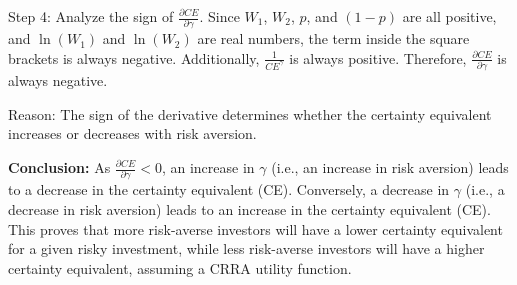 \documentclass{article}
\begin{document}
Step 4: Analyze the sign of $\frac{\partial CE}{\partial \gamma}$.
Since $W_1$, $W_2$, $p$, and $(1-p)$ are all positive, and $\ln(W_1)$ and $\ln(W_2)$ are real numbers, the term inside the square brackets is always negative. Additionally, $\frac{1}{CE^\gamma}$ is always positive. Therefore, $\frac{\partial CE}{\partial \gamma}$ is always negative.

Reason: The sign of the derivative determines whether the certainty equivalent increases or decreases with risk aversion.

\textbf{Conclusion:} As $\frac{\partial CE}{\partial \gamma} < 0$, an increase in $\gamma$ (i.e., an increase in risk aversion) leads to a decrease in the certainty equivalent (CE). Conversely, a decrease in $\gamma$ (i.e., a decrease in risk aversion) leads to an increase in the certainty equivalent (CE). This proves that more risk-averse investors will have a lower certainty equivalent for a given risky investment, while less risk-averse investors will have a higher certainty equivalent, assuming a CRRA utility function.
\end{document}
